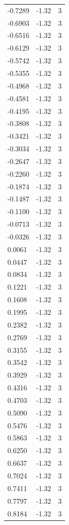 \begin{longtable}{lrr}
  -0.7289 & -1.32 & 3 \\
  -0.6903 & -1.32 & 3 \\
  -0.6516 & -1.32 & 3 \\
  -0.6129 & -1.32 & 3 \\
  -0.5742 & -1.32 & 3 \\
  -0.5355 & -1.32 & 3 \\
  -0.4968 & -1.32 & 3 \\
  -0.4581 & -1.32 & 3 \\
  -0.4195 & -1.32 & 3 \\
  -0.3808 & -1.32 & 3 \\
  -0.3421 & -1.32 & 3 \\
  -0.3034 & -1.32 & 3 \\
  -0.2647 & -1.32 & 3 \\
  -0.2260 & -1.32 & 3 \\
  -0.1874 & -1.32 & 3 \\
  -0.1487 & -1.32 & 3 \\
  -0.1100 & -1.32 & 3 \\
  -0.0713 & -1.32 & 3 \\
  -0.0326 & -1.32 & 3 \\
  0.0061 & -1.32 & 3 \\
  0.0447 & -1.32 & 3 \\
  0.0834 & -1.32 & 3 \\
  0.1221 & -1.32 & 3 \\
  0.1608 & -1.32 & 3 \\
  0.1995 & -1.32 & 3 \\
  0.2382 & -1.32 & 3 \\
  0.2769 & -1.32 & 3 \\
  0.3155 & -1.32 & 3 \\
  0.3542 & -1.32 & 3 \\
  0.3929 & -1.32 & 3 \\
  0.4316 & -1.32 & 3 \\
  0.4703 & -1.32 & 3 \\
  0.5090 & -1.32 & 3 \\
  0.5476 & -1.32 & 3 \\
  0.5863 & -1.32 & 3 \\
  0.6250 & -1.32 & 3 \\
  0.6637 & -1.32 & 3 \\
  0.7024 & -1.32 & 3 \\
  0.7411 & -1.32 & 3 \\
  0.7797 & -1.32 & 3 \\
  0.8184 & -1.32 & 3 \\

\end{longtable}
